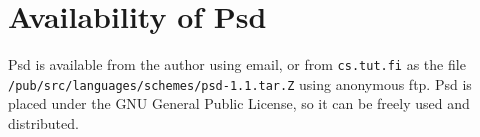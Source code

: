 \section{Availability of Psd}

Psd is available from the author using email, or from {\tt cs.tut.fi}
as the file {\tt /pub/src/languages/schemes/psd-1.1.tar.Z} using
anonymous ftp. Psd is placed under the GNU General Public
License, so it can be freely used and
distributed.






